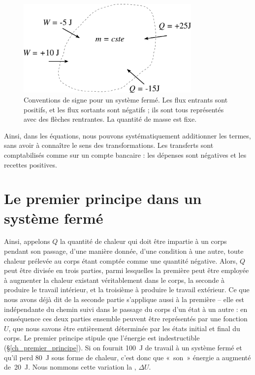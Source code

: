 		\begin{figure}
			\begin{center}
				\includegraphics[width=9cm]{images/convention_systeme_ferme.png}
			\end{center}
			\caption{Conventions de signe pour un système fermé. Les flux entrants sont positifs, et les flux sortants sont négatifs ; ils sont tous représentés avec des flèches rentrantes. La quantité de masse est fixe.}
			\label{fig_convention_signe_sf}
		\end{figure}

		Ainsi, dans les équations, nous pouvons systématiquement additionner les termes, sans avoir à connaître le sens des transformations. Les transferts sont comptabilisés comme sur  un compte bancaire : les dépenses sont négatives et les recettes positives.



\section{Le premier principe dans un système fermé}
\label{ch_premier_principe_sf}

		Ainsi, appelons $Q$ la quantité de chaleur qui doit être impartie à un corps pendant son passage, d’une manière donnée, d’une condition à une autre, toute chaleur prélevée au corps étant comptée comme une quantité négative. Alors, $Q$ peut être divisée en trois parties, parmi lesquelles la première peut être employée à augmenter la chaleur existant véritablement dans le corps, la seconde à produire le travail intérieur, et la troisième à produire le travail extérieur. Ce que nous avons déjà dit de la seconde partie s’applique aussi à la première -- elle est indépendante du chemin suivi dans le passage du corps d’un état à un autre : en conséquence ces deux parties ensemble peuvent être représentés par une fonction $U$, que nous savons être entièrement déterminée par les états initial et final du corps.
	Le premier principe stipule que l’énergie est indestructible (\S\ref{ch_premier_principe}). Si on fournit \SI{100}{\joule} de travail à un système fermé et qu’il perd \SI{80}{\joule} sous forme de chaleur, c’est donc que «~son~» énergie a augmenté de~\SI{20}{\joule}. Nous nommons cette variation la , $\Delta U$. 
	
